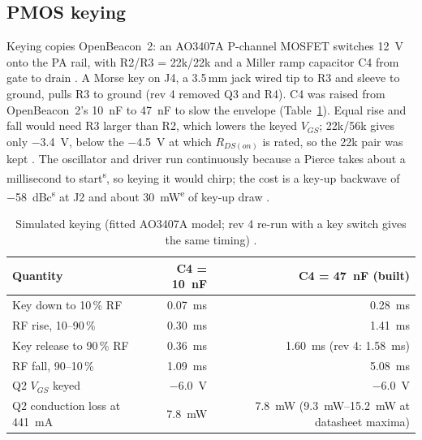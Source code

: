 \documentclass[11pt,letterpaper]{article}
\newcommand{\est}{\textsuperscript{e}}
\newcommand{\simv}{\textsuperscript{s}}
\begin{document}
\subsection{PMOS keying}\label{sec:keying}

Keying copies OpenBeacon~2: an AO3407A P-channel MOSFET switches \SI{12}{\volt} onto the PA rail, with R2/R3 = 22k/22k and a Miller ramp capacitor C4 from gate to drain \cite{openbeacon2,aosAO3407A}. A Morse key on J4, a 3.5\,mm jack wired tip to R3 and sleeve to ground, pulls R3 to ground (rev 4 removed Q3 and R4). C4 was raised from OpenBeacon~2's \SI{10}{\nano\farad} to \SI{47}{\nano\farad} to slow the envelope (Table~\ref{tab:keying}). Equal rise and fall would need R3 larger than R2, which lowers the keyed $V_{GS}$; 22k/56k gives only \SI{-3.4}{\volt}, below the \SI{-4.5}{\volt} at which $R_{DS(on)}$ is rated, so the 22k pair was kept \cite{projnotes,aosAO3407A}. The oscillator and driver run continuously because a Pierce takes about a millisecond to start\simv{}, so keying it would chirp; the cost is a key-up backwave of \SI{-58}{dBc}\simv{} at J2 and about \SI{30}{\milli\watt}\est{} of key-up draw \cite{projsim,projnotes}.

\begin{table}[h]
\centering\small
\caption{Simulated keying (fitted AO3407A model; rev 4 re-run with a key switch gives the same timing) \cite{projsim}.}\label{tab:keying}
\begin{tabular}{@{}lrr@{}}
\toprule
Quantity & C4 = \SI{10}{\nano\farad} & C4 = \SI{47}{\nano\farad} (built) \\ \midrule
Key down to 10\,\% RF & \SI{0.07}{\milli\second} & \SI{0.28}{\milli\second} \\
RF rise, 10--90\,\% & \SI{0.30}{\milli\second} & \SI{1.41}{\milli\second} \\
Key release to 90\,\% RF & \SI{0.36}{\milli\second} & \SI{1.60}{\milli\second} (rev 4: \SI{1.58}{\milli\second}) \\
RF fall, 90--10\,\% & \SI{1.09}{\milli\second} & \SI{5.08}{\milli\second} \\
Q2 $V_{GS}$ keyed & \SI{-6.0}{\volt} & \SI{-6.0}{\volt} \\
Q2 conduction loss at \SI{441}{\milli\ampere} & \SI{7.8}{\milli\watt} & \SI{7.8}{\milli\watt} (\SIrange{9.3}{15.2}{\milli\watt} at datasheet maxima) \\
\bottomrule
\end{tabular}
\end{table}
\end{document}
